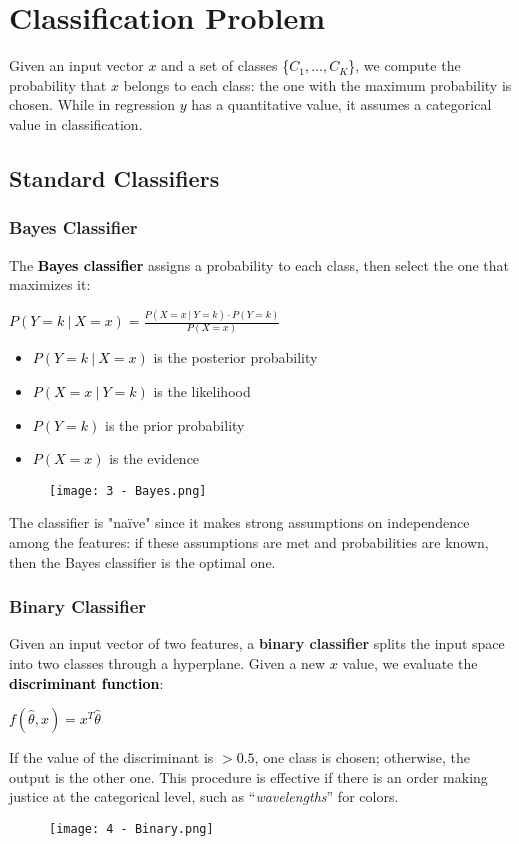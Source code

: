 \documentclass{article}
\newcommand{\bb}[1]{\textcolor{black}{\textbf{#1}}}
\newcommand{\rr}[1]{\textcolor{black}{#1}}
\newcommand{\cc}[1]{\begin{center}\textcolor{black}{#1}\end{center}}
\begin{document}
\newpage

\section{Classification Problem}
Given an input vector \rr{$x$} and a set of classes \rr{\{$C_1, \dots, C_K$\}}, we compute the probability that \rr{$x$} belongs to each class: the one with the maximum probability is chosen. While in regression \rr{$y$} has a quantitative value, it assumes a categorical value in classification. 

\subsection{Standard Classifiers}
\subsubsection{Bayes Classifier}
The \bb{Bayes classifier} assigns a probability to each class, then select the one that maximizes it:
\cc{$P(Y=k\ |\ X=x) = \displaystyle\frac{P(X=x\ |\ Y=k) \cdot P(Y = k)}{P(X=x)}$}
\begin{itemize}
    \item \rr{$P(Y = k\ | \ X = x)$} is the posterior probability
    \item \rr{$P(X = x\ | \ Y = k)$} is the likelihood
    \item \rr{$P(Y = k)$} is the prior probability
    \item \rr{$P(X = x)$} is the evidence
\end{itemize}
\begin{figure}[H]
    \centering
    \texttt{[image: 3 - Bayes.png]}
\end{figure}
The classifier is "naïve" since it makes strong assumptions on independence among the features: if these assumptions are met and probabilities are known, then the Bayes classifier is the optimal one.
\subsubsection{Binary Classifier}
Given an input vector of two features, a \textbf{binary classifier} splits the input space into two classes through a hyperplane. Given a new \rr{$x$} value, we evaluate the \bb{discriminant function}:
\cc{$f(\hat{\theta}, x) = x^T\hat{\theta}$}
If the value of the discriminant is \rr{$> 0.5$}, one class is chosen; otherwise, the output is the other one. This procedure is effective if there is an order making justice at the categorical level, such as “\textit{wavelengths}” for colors. 
\begin{figure}[H]
    \centering
    \texttt{[image: 4 - Binary.png]}
\end{figure}
\end{document}
